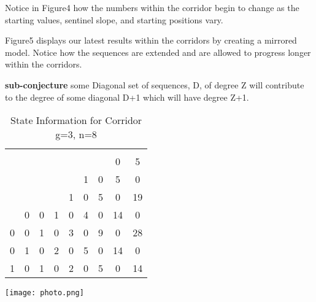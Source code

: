 \documentclass{article}
\begin{document}
Notice in Figure4 how the numbers within the corridor begin to change as the starting values, sentinel slope, and starting positions vary. 

Figure5 displays our latest results within the corridors by creating a mirrored model. Notice how the sequences are extended and are allowed to progress longer within the corridors.


\textbf{sub-conjecture} some Diagonal set of sequences, D, of degree Z will contribute to the degree of some diagonal D+1 which will have degree Z+1.

\begin{table}
\caption{State Information for Corridor g=3, n=8}
\begin{center}
\begin{tabular}{ |c|c|c|c|c|c|c|c|c| } 
 \hline
     &    &   &    &    &   &   &    & \\ 
     &    &   &    &    &   &   & 0  &5 \\ 
     &    &   &    &    & 1 & 0 & 5  &0 \\ 
     &    &   &    &  1 & 0 & 5 & 0  &19 \\ 
     &  0 & 0 &  1 &  0 & 4 & 0 & 14 &0 \\ 
   0 &  0 & 1 &  0 &  3 & 0 & 9 & 0  &28 \\ 
   0 &  1 & 0 &  2 &  0 & 5 & 0 & 14 &0 \\ 
   1 &  0 & 1 &  0 &  2 & 0 & 5 & 0  &14 \\ 
 \hline
\end{tabular}
\end{center}
\end{table}



\texttt{[image: photo.png]}










 

 
\end{document}
